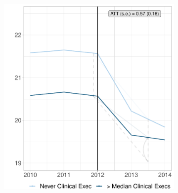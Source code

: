 \documentclass[12pt]{article}
\begin{document}
\begin{figure}[ht!]
\begin{subfigure}[b]{0.45\textwidth}
         \includegraphics[width=\textwidth]{Objects/cont_abovemedread_md_nomd_size_synth_graph.pdf}
         \label{fig:abovemed_read_synth_clinical}
     \end{subfigure}
        \label{fig:cont_clinicalsynthdid}
    \end{figure}
\end{document}
